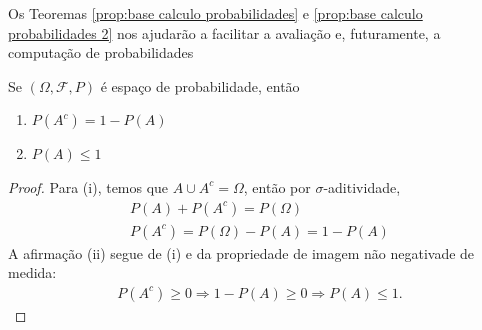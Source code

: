 
Os Teoremas \ref{prop:base calculo probabilidades} e \ref{prop:base calculo probabilidades 2}
nos ajudarão a facilitar a avaliação e, futuramente, a computação de probabilidades

\begin{prop:base calculo probabilidades}
\label{prop:base calculo probabilidades}
Se $(\Omega, \mathcal{F}, P)$ é espaço de probabilidade, então
\begin{enumerate}
	\item[i.] $P(A^c) = 1 - P(A)$
	\item[ii.] $P(A) \leq 1$
\end{enumerate}
\begin{proof}
	Para (i), temos que $A \cup A^c = \Omega$, então por $\sigma$-aditividade,
	\begin{gather*}
		P(A) + P(A^c) = P(\Omega) \\
		P(A^c) = P(\Omega) - P(A) = 1 - P(A)
	\end{gather*}
	A afirmação (ii) segue de (i) e da propriedade de imagem não negativade
	de medida:
	\begin{gather*}
		P(A^c) \geq 0 \Longrightarrow 1 - P(A) \geq 0 \Longrightarrow P(A) \leq 1.
	\end{gather*}
\end{proof}
\end{prop:base calculo probabilidades}

